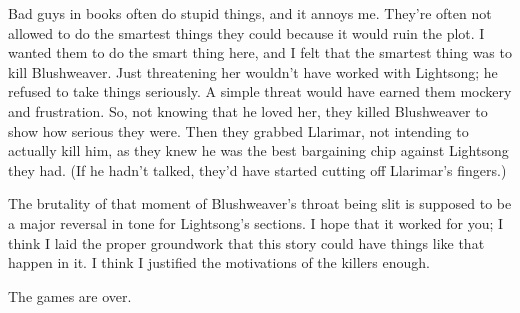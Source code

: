 Bad guys in books often do stupid things, and it annoys me. They’re often not allowed to do the smartest things they could because it would ruin the plot. I wanted them to do the smart thing here, and I felt that the smartest thing was to kill Blushweaver. Just threatening her wouldn’t have worked with Lightsong; he refused to take things seriously. A simple threat would have earned them mockery and frustration. So, not knowing that he loved her, they killed Blushweaver to show how serious they were. Then they grabbed Llarimar, not intending to actually kill him, as they knew he was the best bargaining chip against Lightsong they had. (If he hadn’t talked, they’d have started cutting off Llarimar’s fingers.)

The brutality of that moment of Blushweaver’s throat being slit is supposed to be a major reversal in tone for Lightsong’s sections. I hope that it worked for you; I think I laid the proper groundwork that this story could have things like that happen in it. I think I justified the motivations of the killers enough.

The games are over.



